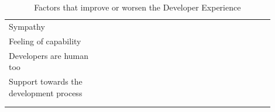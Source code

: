 \documentclass[english, 12pt, a4paper, sci, utf8, a-1b, online]{aaltothesis}
\begin{document}
\begin{center}
\begin{longtable}{p{0.3\linewidth}p{0.6\linewidth}}
    Sympathy                                & \textcite{contributing-as-a-designer}                                                                                                                                                                                                                                                                                        \\
    Feeling of capability                   & \textcite{what-is-developer-experience-everydeveloper} \newline \textcite{developer-experience-sanity}                                                                                                                                                                                                                       \\
    Developers are human too                & \textcite{api-developer-experience-dx-resources} \newline \textcite{apis-for-humans-the-rise-of-developer-experience}                                                                                                                                                                                                        \\
    Support towards the development process & \textcite{effective-developer-experience} \newline \textcite{developer-experience-what-and-why}                                                                                                                                                                                                                              \\
    \captionsetup{width=0.6\textwidth}                                                                                                                                                                                                                                                                                                                                     \\
    \caption{Factors that improve or worsen the Developer Experience}                                                                                                                                                                                                                                                                                                      \\
  \end{longtable}
\end{center}
\renewcommand{\arraystretch}{1}
\end{document}
